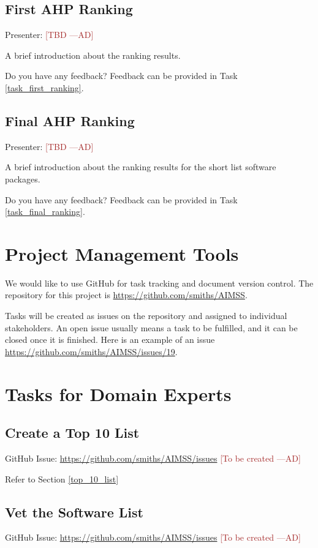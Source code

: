 \documentclass[12pt]{article}
\newcommand{\authornote}[3]{\textcolor{#1}{[#3 ---#2]}}
\newcommand{\authornote}[3]{}
\newcommand{\ad}[1]{\authornote{brown}{AD}{#1}} %
\begin{document}
\subsection{First AHP Ranking}
\label{first_AHP}
Presenter: \ad{TBD}

A brief introduction about the ranking results.

Do you have any feedback? Feedback can be provided in Task \ref{task_first_ranking}.

\subsection{Final AHP Ranking}
\label{final_AHP}
Presenter: \ad{TBD}

A brief introduction about the ranking results for the short list software packages.

Do you have any feedback? Feedback can be provided in Task \ref{task_final_ranking}.

\appendix
\section{Project Management Tools}
\label{proj_mgmt_tools}
We would like to use GitHub for task tracking and document version control. The
repository for this project is
\href{https://github.com/smiths/AIMSS}{https://github.com/smiths/AIMSS}.

Tasks will be created as issues on the repository and assigned to individual
stakeholders. An open issue usually means a task to be fulfilled, and it can be
closed once it is finished. Here is an example of an issue
\href{https://github.com/smiths/AIMSS/issues/19}{https://github.com/smiths/AIMSS/issues/19}.

\newpage

\section{Tasks for Domain Experts}
\label{tasks_domain_experts}

\subsection{Create a Top 10 List}
\label{task_top_10_list}
GitHub Issue:
\href{https://github.com/smiths/AIMSS/issues}{https://github.com/smiths/AIMSS/issues}
\ad{To be created}

\noindent Refer to Section \ref{top_10_list}

\subsection{Vet the Software List}
\label{task_software_list}
GitHub Issue:
\href{https://github.com/smiths/AIMSS/issues}{https://github.com/smiths/AIMSS/issues}
\ad{To be created}
\end{document}

